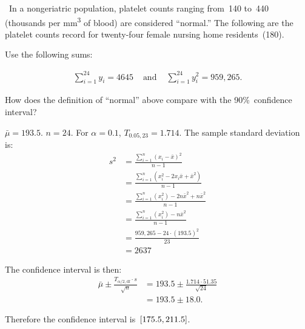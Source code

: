 \begin{problem}
  ~In a nongeriatric population, platelet counts ranging from~140 to~440 (thousands per mm\textsuperscript{3} of blood) are considered ``normal.'' The following are the platelet counts record for twenty-four female nursing home residents~(180).

  Use the following sums:

  \begin{align}
    \sum_{i=1}^{24} y_i = 4645 &\text{ and }  &\sum_{i=1}^{24} y_i^{2} = 959,265 \text{.}
  \end{align}

  How does the definition of ``normal'' above compare with the 90\%~confidence interval?
\end{problem}

${\bar{\mu} = 193.5}$. ${n = 24}$.  For ${\alpha = 0.1}$, ${T_{0.05,23} = 1.714}$. The sample standard deviation is:
\begin{align}
  s^{2} &= \frac{\sum_{i=1}^{n} \left(x_i - \bar{x}\right)^2}{n-1} \\
        &= \frac{\sum_{i=1}^{n} \left(x^2_{i} - 2x_i \bar{x} + \bar{x}^2\right)}{n-1} \\
        &= \frac{\sum_{i=1}^{n} \left(x^2_{i}\right) - 2n\bar{x}^2 + n\bar{x}^2}{n-1} \\
        &= \frac{\sum_{i=1}^{n} \left(x^2_{i}\right) - n\bar{x}^2}{n-1} \\
        &= \frac{959,265 - 24 \cdot \left(193.5\right)^2}{23} \\
        &= 2637
\end{align}

The confidence interval is then:
\begin{align}
  \bar{\mu} \pm \frac{T_{\alpha / 2, \text{df}} \cdot s}{\sqrt{n}} &= 193.5 \pm \frac{1.714 \cdot 51.35}{\sqrt{24}} \\
                                                            &= 193.5 \pm 18.0 \text{.}
\end{align}

Therefore the confidence interval is~$\lbrack175.5,211.5\rbrack$.
